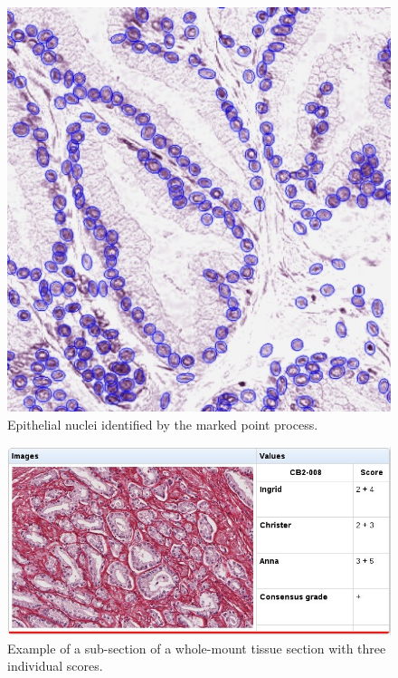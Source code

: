 \documentclass[10pt, a4paper]{article}
\begin{document}
\begin{enumerate}
\begin{figure}
\centering
\includegraphics[width=.5\textwidth]{figures/research/prostate3.jpg}
\caption{Epithelial nuclei identified by the marked point process. \label{fig:prostate3}}
\end{figure}

\begin{figure}
\centering
\includegraphics[width=.9\textwidth]{figures/research/prostate4.jpg}
\caption{Example of a sub-section of a whole-mount tissue section with three individual scores. \label{fig:prostate4}}
\end{figure}

\newpage


\end{enumerate}
\end{document}
